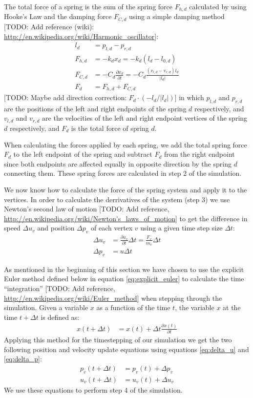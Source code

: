 \documentclass[twoside]{article}
\providecommand{\abs}[1]{\left \lvert #1 \right \rvert}
\begin{document}
\begin{multicols}{2}
The total force of a spring is the sum of the spring force $F_{h,d}$
calculated by using Hooke's Law and the damping force $F_{C,d}$
using a simple damping method [TODO: Add reference (wiki):
\url{http://en.wikipedia.org/wiki/Harmonic_oscillator}]: \begin{align}
\nonumber l_d &= p_{l,d} - p_{r,d} \\ \label{eq:hooke} F_{h,d} &= -k_d x_d
= -k_d (l_d - l_{0,d}) \\ \label{eq:damping} F_{C,d} &= -C_d \frac{\partial
x_d}{ \partial t} = - C_d \frac{\left(v_{l,d} - v_{r,d}\right) l_d}{\abs{l_d}}
\\ F_d &= F_{h,d} + F_{C,d} \end{align} [TODO: Maybe add direction correction:
$F_d \cdot (-l_d / \abs{l_d})$] in which $p_{l,d}$ and $p_{r,d}$ are the
positions of the left and right endpoints of the spring $d$ respectively, and
$v_{l,d}$ and $v_{r,d}$ are the velocities of the left and right endpoint
vertices of the spring $d$ respectively, and $F_d$ is the total force of
spring $d$.

When calculating the forces applied by each spring, we add the total spring
force $F_d$ to the left endpoint of the spring and subtract $F_d$ from the
right endpoint since both endpoints are affected equally in opposite direction
by the spring $d$ connecting them. These spring forces are calculated in step
2 of the simulation.

We now know how to calculate the force of the spring system and apply it
to the vertices. In order to calculate the derrivatives of the system
(step 3) we use Newton's second law of motion [TODO: Add reference,
\url{http://en.wikipedia.org/wiki/Newton's_laws_of_motion}] to get the
difference in speed $\Delta u_v$ and position $\Delta p_v$ of each vertex $v$
using a given time step size $\Delta t$: \begin{align} \label{eq:delta_u}
\Delta u_v &= \frac{\partial u_v}{\partial t} \Delta t = \frac{F_v}{m_v}
\Delta t \\ \label{eq:delta_p} \Delta p_v &= u \Delta t \end{align}

As mentioned in the beginning of this section we have chosen to use the
explicit Euler method defined below in equation \ref{eq:explicit_euler}
to calculate the time ``integration'' [TODO: Add reference,
\url{http://en.wikipedia.org/wiki/Euler_method}] when stepping through
the simulation. Given a variable $x$ as a function of the time $t$, the
variable $x$ at the time $t + \Delta t$ is defined as: \begin{align}
\label{eq:explicit_euler} x(t+\Delta t) &= x(t) + \Delta t \frac{\partial
x(t)}{\partial t} \end{align} Applying this method for the timestepping
of our simulation we get the two following position and velocity update
equations using equations \ref{eq:delta_u} and \ref{eq:delta_p}: \begin{align}
p_v(t+\Delta t) &= p_v(t) + \Delta p_v \\ u_v(t+\Delta t) &= u_v(t) + \Delta
u_v \end{align} We use these equations to perform step 4 of the simulation.


\end{multicols}
\end{document}
